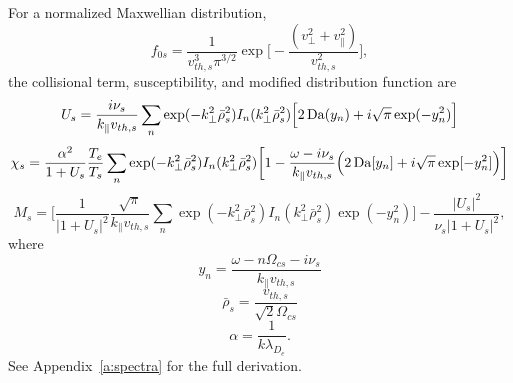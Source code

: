 For a normalized Maxwellian distribution,
\begin{equation}
	f_{0s} = 
	\frac{1}{v_{th,s}^3\pi^{3/2}}
	\exp\bigg[- \frac{(v_\perp^2 + v_\parallel^2)}{v_{th,s}^2} \bigg],
\end{equation}
the collisional term, susceptibility, and modified distribution function are
\begin{equation}
	U_s = 
	\frac{i \nu_{s}}{k_\parallel v_{th,s}} 
	\sum_n \exp(-k_\perp^2 \bar{\rho}_s^2) I_n (k_\perp^2 \bar{\rho}_s^2) 
	\Big[ 2 \operatorname{Da}(y_n) + i \sqrt{\pi} \exp(-y_n^2) \Big]
	\label{eq:Us_exact}
\end{equation}
\begin{equation}
	\chi_s = 
	\frac{\alpha^2}{1+U_s} \frac{T_e}{T_s} 
	\sum_n \exp(-k_\perp^2 \bar{\rho}_s^2) I_n (k_\perp^2 \bar{\rho}_s^2) 
	\bigg[ 1 - \frac{\omega-i\nu_s}{k_\parallel v_{th,s}} 
	\Big( 2 \operatorname{Da}[y_n] + i \sqrt{\pi} \exp[-y_n^2] \Big)
	\bigg]
	\label{eq:chis_exact}
\end{equation}
\begin{equation}
	M_s = 
	\Bigg[
	\frac{1}{|1+U_s|^2} \frac{\sqrt{\pi}}{k_\parallel v_{th,s}}
	\sum_n \exp(-k_\perp^2 \bar{\rho}_s^2) I_n (k_\perp^2 \bar{\rho}_s^2) \exp(-y_n^2)
	\Bigg]
	- \frac{|U_s|^2}{\nu_s |1+U_s|^2},
\end{equation}
where
\begin{equation}
	y_n = \frac{\omega-n\Omega_{cs}-i\nu_s}{k_\parallel v_{th,s}}
\end{equation}
\begin{equation}
	\bar{\rho}_s = \frac{v_{th,s}}{\sqrt{2}\Omega_{cs}}
\end{equation}
\begin{equation}
	\alpha = \frac{1}{k \lambda_{D_e}}.
\end{equation}
See Appendix~\ref{a:spectra} for the full derivation.


